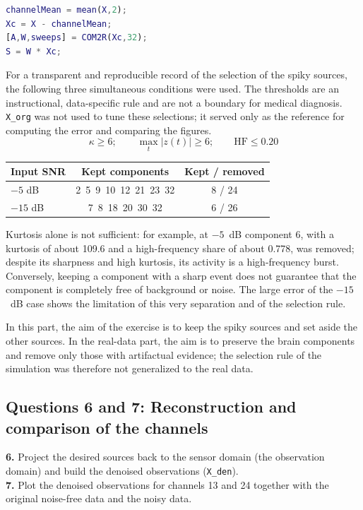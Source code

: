 \begin{lstlisting}[language=Matlab]
channelMean = mean(X,2);
Xc = X - channelMean;
[A,W,sweeps] = COM2R(Xc,32);
S = W * Xc;
\end{lstlisting}

For a transparent and reproducible record of the selection of the spiky sources, the following three simultaneous conditions were used. The thresholds are an instructional, data-specific rule and are not a boundary for medical diagnosis. \texttt{X\_org} was not used to tune these selections; it served only as the reference for computing the error and comparing the figures.
\begin{equation}
\kappa\ge 6;\qquad \max_t|z(t)|\ge 6;\qquad \mathrm{HF}\le 0.20
\end{equation}

\begin{center}
\begin{tabular}{@{}lcc@{}}
\toprule
\textbf{Input SNR} & \textbf{Kept components} & \textbf{Kept / removed}\\
\midrule
$-5$ dB  & 2\ 5\ 9\ 10\ 12\ 21\ 23\ 32 & 8 / 24\\
$-15$ dB & 7\ 8\ 18\ 20\ 30\ 32        & 6 / 26\\
\bottomrule
\end{tabular}
\end{center}

Kurtosis alone is not sufficient: for example, at $-5$~dB component 6, with a kurtosis of about 109.6 and a high-frequency share of about 0.778, was removed; despite its sharpness and high kurtosis, its activity is a high-frequency burst. Conversely, keeping a component with a sharp event does not guarantee that the component is completely free of background or noise. The large error of the $-15$~dB case shows the limitation of this very separation and of the selection rule.

In this part, the aim of the exercise is to keep the spiky sources and set aside the other sources. In the real-data part, the aim is to preserve the brain components and remove only those with artifactual evidence; the selection rule of the simulation was therefore not generalized to the real data.

\subsection*{Questions 6 and 7: Reconstruction and comparison of the channels}
\begin{taskbox}
\textbf{6.} Project the desired sources back to the sensor domain (the observation domain) and build the denoised observations (\texttt{X\_den}).\\
\textbf{7.} Plot the denoised observations for channels 13 and 24 together with the original noise-free data and the noisy data.
\end{taskbox}


